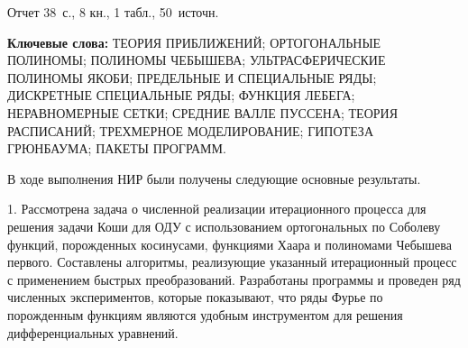 \Referat %

Отчет 38~с., 8 кн., 1 табл., 50~источн.

 \bigskip
 \textbf{ Ключевые
  слова:}
  ТЕОРИЯ ПРИБЛИЖЕНИЙ; ОРТОГОНАЛЬНЫЕ ПОЛИНОМЫ; ПОЛИНОМЫ ЧЕБЫШЕВА; УЛЬТРАСФЕРИЧЕСКИЕ ПОЛИНОМЫ ЯКОБИ; ПРЕДЕЛЬНЫЕ И СПЕЦИАЛЬНЫЕ РЯДЫ; ДИСКРЕТНЫЕ СПЕЦИАЛЬНЫЕ РЯДЫ; ФУНКЦИЯ ЛЕБЕГА; НЕРАВНОМЕРНЫЕ СЕТКИ; СРЕДНИЕ ВАЛЛЕ ПУССЕНА; ТЕОРИЯ РАСПИСАНИЙ; ТРЕХМЕРНОЕ МОДЕЛИРОВАНИЕ; ГИПОТЕЗА ГРЮНБАУМА; ПАКЕТЫ ПРОГРАММ.

 \bigskip

В ходе выполнения НИР были получены следующие основные результаты.

1. Рассмотрена задача о численной реализации итерационного процесса для решения задачи Коши для ОДУ с использованием ортогональных по Соболеву функций, порожденных косинусами, функциями Хаара и полиномами Чебышева первого. Составлены алгоритмы, реализующие указанный итерационный процесс с применением быстрых преобразований. Разработаны программы и проведен ряд численных экспериментов, которые показывают, что ряды Фурье по порожденным функциям являются удобным инструментом для решения дифференциальных уравнений.


%

















